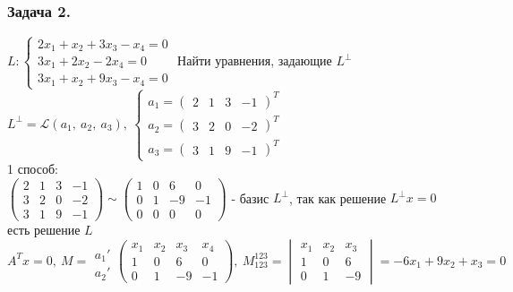 \documentclass[12pt, letterpaper, twoside]{article}
\begin{document}
\subsubsection*{Задача 2.}
$L: \begin{cases}
    2x_1 + x_2 + 3x_3 - x_4 = 0\\
    3x_1 + 2x_2 - 2x_4 = 0\\
    3x_1 + x_2 + 9x_3 - x_4 = 0
\end{cases}$
Найти уравнения, задающие $L^{\bot}$\\
$L^{\bot} = \mathcal{L} (a_1,\ a_2,\ a_3),\ \begin{cases}a_1 = \begin{pmatrix}
    2 & 1 & 3 & -1
\end{pmatrix}^T\\
a_2 = \begin{pmatrix}
    3 & 2 & 0 & -2
\end{pmatrix}^T\\
a_3 = \begin{pmatrix}
    3 & 1 & 9 & -1
\end{pmatrix}^T
\end{cases}$\\
1 способ:\\
$\begin{pmatrix}
    2 & 1 & 3 & -1\\
    3 & 2 & 0 & -2\\
    3 & 1 & 9 & -1
\end{pmatrix}\sim \begin{pmatrix}
    1 & 0 & 6 & 0\\
    0 & 1 & -9 & -1\\
    0 & 0 & 0 & 0
\end{pmatrix}$ - базис $L^{\bot}$, так как решение $L^{\bot}x = 0$ есть решение $L$
\[A^T x = 0,\ M = \begin{matrix}
    \\ a_1' \\ a_2'
\end{matrix} \begin{pmatrix}
    x_1 & x_2 & x_3 & x_4\\
    1 & 0 & 6 & 0\\
    0 & 1 & -9 & -1
\end{pmatrix},\ M_{123}^{123} = \begin{vmatrix}
    x_1 & x_2 & x_3\\
    1 & 0 & 6\\
    0 & 1 & -9
\end{vmatrix} = -6x_1 + 9x_2 + x_3 = 0\]
\end{document}
